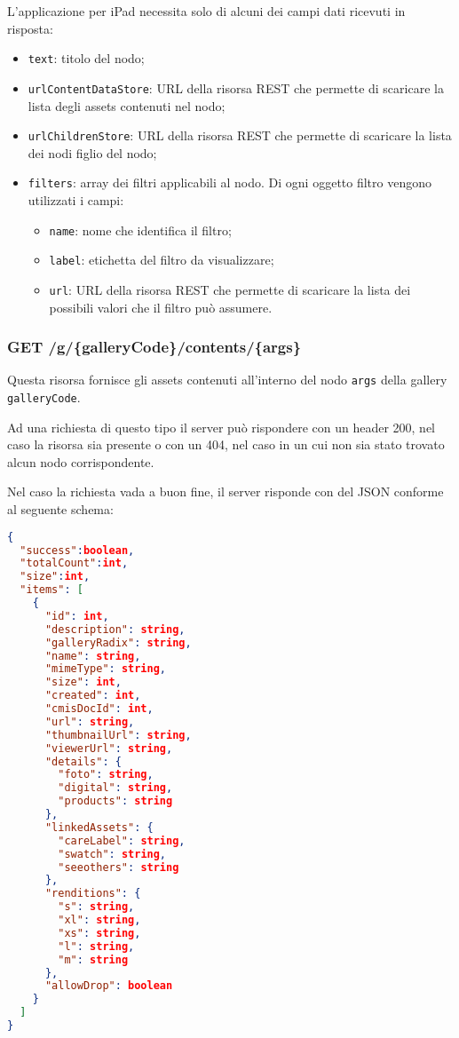 L'applicazione per iPad necessita solo di alcuni dei campi dati ricevuti in risposta:
\begin{itemize}
\item \texttt{text}: titolo del nodo;
\item \texttt{urlContentDataStore}: URL della risorsa REST che permette di scaricare la lista degli assets contenuti nel nodo;
\item \texttt{urlChildrenStore}: URL della risorsa REST che permette di scaricare la lista dei nodi figlio del nodo;
\item \texttt{filters}: array dei filtri applicabili al nodo. Di ogni oggetto filtro vengono utilizzati i campi:
	\begin{itemize}
	\item \texttt{name}: nome che identifica il filtro;
	\item \texttt{label}: etichetta del filtro da visualizzare;
	\item \texttt{url}: URL della risorsa REST che permette di scaricare la lista dei possibili valori che il filtro può assumere.
	\end{itemize}
\end{itemize}

\subsubsection{GET /g/\{galleryCode\}/contents/\{args\}}

Questa risorsa fornisce gli assets contenuti all'interno del nodo \texttt{args} della gallery \texttt{galleryCode}.

Ad una richiesta di questo tipo il server può rispondere con un header 200, nel caso la risorsa sia presente o con un 404, nel caso in un cui non sia stato trovato alcun nodo corrispondente.

Nel caso la richiesta vada a buon fine, il server risponde con del JSON conforme al seguente schema:
\begin{lstlisting}[language=JSON, caption=JSON Schema di GET /g/{galleryCode}/contents/{args}]
{
  "success":boolean,
  "totalCount":int,
  "size":int,
  "items": [
    {
      "id": int,
      "description": string,
      "galleryRadix": string,
      "name": string,
      "mimeType": string,
      "size": int,
      "created": int,
      "cmisDocId": int,
      "url": string,
      "thumbnailUrl": string,
      "viewerUrl": string,
      "details": {
        "foto": string,
        "digital": string,
        "products": string
      },
      "linkedAssets": {
        "careLabel": string,
        "swatch": string,
        "seeothers": string
      },
      "renditions": {
        "s": string,
        "xl": string,
        "xs": string,
        "l": string,
        "m": string
      },
      "allowDrop": boolean
    }
  ]
}
\end{lstlisting}
\FloatBarrier


